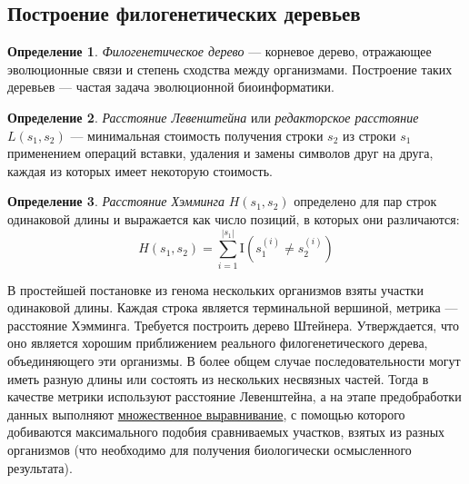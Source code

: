 \documentclass[11pt,a4paper]{report}
\theoremstyle{definition}
\theoremstyle{definition}
\theoremstyle{definition}
\newtheorem{definition}{Определение}[section]
\begin{document}
	\subsection{Построение филогенетических деревьев}
	\begin{definition}
		\textit{Филогенетическое дерево} — корневое дерево, отражающее эволюционные связи и степень сходства между организмами. Построение таких деревьев — частая задача эволюционной биоинформатики.
	\end{definition}
	\begin{definition}
		\textit{Расстояние Левенштейна} или \textit{редакторское расстояние} $ L(s_1, s_2) $ — минимальная стоимость получения строки $s_2$ из строки $s_1$ применением операций вставки, удаления и замены символов друг на друга, каждая из которых имеет некоторую стоимость. 
	\end{definition}
	\begin{definition}
		\textit{Расстояние Хэмминга} $ H(s_1, s_2) $ определено для пар строк одинаковой длины и выражается как число позиций, в которых они различаются: 
		$$
			H(s_1, s_2) = \sum_{i=1}^{|s_1|} \mathrm{I}\left (s_1^{(i)} \neq s_2^{(i)}\right )
		$$
	\end{definition} 
	\noindent В простейшей постановке из генома нескольких организмов взяты участки одинаковой длины. Каждая строка является терминальной вершиной, метрика — расстояние Хэмминга. Требуется построить дерево Штейнера. Утверждается, что оно является хорошим приближением реального филогенетического дерева, объединяющего эти организмы. В более общем случае последовательности могут иметь разную длины или состоять из нескольких несвязных частей. Тогда в качестве метрики используют расстояние Левенштейна, а на этапе предобработки данных выполняют \href{https://en.wikipedia.org/wiki/Sequence_alignment}{множественное выравнивание}, с помощью которого добиваются максимального подобия сравниваемых участков, взятых из разных организмов (что необходимо для получения биологически осмысленного результата).\\
	
\end{document}
